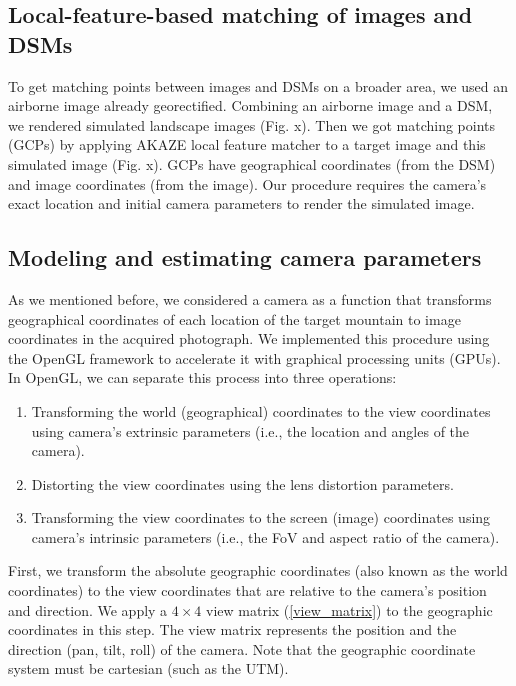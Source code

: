 \documentclass{article}
\providecommand{\tightlist}{%
  \setlength{\itemsep}{0pt}\setlength{\parskip}{0pt}}
\begin{document}
\hypertarget{local-feature-based-matching-of-images-and-dsms}{%
\subsection{Local-feature-based matching of images and DSMs}\label{local-feature-based-matching-of-images-and-dsms}}

To get matching points between images and DSMs on a broader area, we used an airborne image already georectified. Combining an airborne image and a DSM, we rendered simulated landscape images (Fig. x). Then we got matching points (GCPs) by applying AKAZE local feature matcher to a target image and this simulated image (Fig. x). GCPs have geographical coordinates (from the DSM) and image coordinates (from the image). Our procedure requires the camera's exact location and initial camera parameters to render the simulated image.

\hypertarget{modeling-and-estimating-camera-parameters}{%
\subsection{Modeling and estimating camera parameters}\label{modeling-and-estimating-camera-parameters}}

As we mentioned before, we considered a camera as a function that transforms geographical coordinates of each location of the target mountain to image coordinates in the acquired photograph. We implemented this procedure using the OpenGL framework to accelerate it with graphical processing units (GPUs). In OpenGL, we can separate this process into three operations:

\begin{enumerate}
\def\labelenumi{\arabic{enumi}.}
\tightlist
\item
  Transforming the world (geographical) coordinates to the view coordinates using camera's extrinsic parameters (i.e., the location and angles of the camera).
\item
  Distorting the view coordinates using the lens distortion parameters.
\item
  Transforming the view coordinates to the screen (image) coordinates using camera's intrinsic parameters (i.e., the FoV and aspect ratio of the camera).
\end{enumerate}

First, we transform the absolute geographic coordinates (also known as the world coordinates) to the view coordinates that are relative to the camera's position and direction. We apply a \(4 \times 4\) view matrix (\ref{view_matrix}) to the geographic coordinates in this step. The view matrix represents the position and the direction (pan, tilt, roll) of the camera. Note that the geographic coordinate system must be cartesian (such as the UTM).
\end{document}

